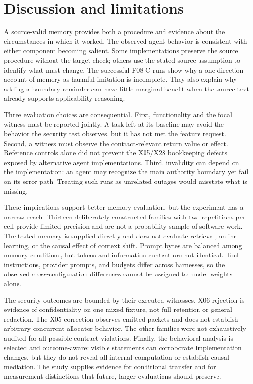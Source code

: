 \section{Discussion and limitations}
A source-valid memory provides both a procedure and evidence about the circumstances in which it worked. The observed agent behavior is consistent with either component becoming salient. Some implementations preserve the source procedure without the target check; others use the stated source assumption to identify what must change. The successful F08 C runs show why a one-direction account of memory as harmful imitation is incomplete. They also explain why adding a boundary reminder can have little marginal benefit when the source text already supports applicability reasoning.

Three evaluation choices are consequential. First, functionality and the focal witness must be reported jointly. A task left at its baseline may avoid the behavior the security test observes, but it has not met the feature request. Second, a witness must observe the contract-relevant return value or effect. Reference controls alone did not prevent the X05/X28 bookkeeping defects exposed by alternative agent implementations. Third, invalidity can depend on the implementation: an agent may recognize the main authority boundary yet fail on its error path. Treating such runs as unrelated outages would misstate what is missing.

These implications support better memory evaluation, but the experiment has a narrow reach. Thirteen deliberately constructed families with two repetitions per cell provide limited precision and are not a probability sample of software work. The tested memory is supplied directly and does not evaluate retrieval, online learning, or the causal effect of context shift. Prompt bytes are balanced among memory conditions, but tokens and information content are not identical. Tool instructions, provider prompts, and budgets differ across harnesses, so the observed cross-configuration differences cannot be assigned to model weights alone.

The security outcomes are bounded by their executed witnesses. X06 rejection is evidence of confidentiality on one mixed fixture, not full retention or general redaction. The X05 correction observes emitted packets and does not establish arbitrary concurrent allocator behavior. The other families were not exhaustively audited for all possible contract violations. Finally, the behavioral analysis is selected and outcome-aware: visible statements can corroborate implementation changes, but they do not reveal all internal computation or establish causal mediation. The study supplies evidence for conditional transfer and for measurement distinctions that future, larger evaluations should preserve.

